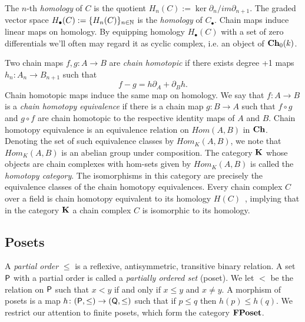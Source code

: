 The $n$-th \emph{homology} of $C$ is the quotient $H_n(C):= \ker \partial_n/im \partial_{n+1}$.  The graded vector space $H_\bullet(C) := \{H_n(C)\}_{n\in {\mathbb{N}}}$ is the {\em homology} of $C_\bullet$.  Chain maps induce linear maps on homology.  By equipping homology $H_\bullet(C)$ with a set of zero differentials we'll often may regard it as cyclic complex, i.e. an object of ${\bf Ch}_0(k)$.   


Two chain maps $f,g \colon A\to B$ are {\em chain homotopic} if there exists degree +1 maps $h_n\colon A_n\to B_{n+1}$ such that 
\[
f-g = h\partial_A+\partial_Bh.
\]  
Chain homotopic maps induce the same map on homology.    We say that $f \colon A\to B$ is a {\em chain homotopy equivalence} if there is a chain map $g \colon B\to A$ such that $f\circ g$ and $g\circ f$ are chain homotopic to the respective identity maps of $A$ and $B$.  Chain homotopy equivalence is an equivalence relation on $Hom(A,B)$ in ${\bf Ch}$.  
Denoting the set of  such equivalence classes by $Hom_K(A,B)$, we note that $Hom_K(A,B)$ is an abelian group under composition.  
The category ${\bf K}$ whose objects are chain complexes with hom-sets given by $Hom_K(A,B)$ is called the \emph{homotopy category}.  
The isomorphisms in this category are precisely the equivalence classes of the chain homotopy equivalences.  Every chain complex $C$ over a field is chain homotopy equivalent to its homology $H(C)$~\cite{weibel}, implying that in the category ${\bf K}$ a chain complex $C$ is isomorphic to its homology.

\subsection{Posets}
A \emph{partial order} $\leq$ is a reflexive, antisymmetric, transitive binary relation.
A set ${\mathsf P}$ with a partial order is called a \emph{partially ordered set} (poset).  We let $<$ be the relation on ${\mathsf P}$ such that $x<y$ if and only if $x\leq y$ and $x\neq y$.
A morphism of posets is a map $h\colon({\mathsf P},\leq)\to ({\mathsf Q},\leq)$ such that if $p\leq q$ then $h(p)\leq h(q)$.  
We restrict our attention to finite posets, which form the category ${\bf FPoset}$.  

